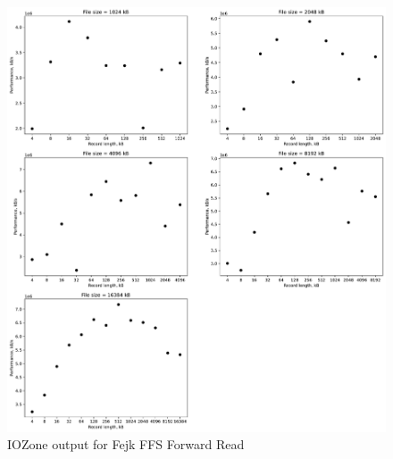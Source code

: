 \begin{figure}[!htb]
	\label{fig:app_bencfh_ffs_read}
	\begin{center}
		\includegraphics[width=1.0\textwidth]{figures/benchmarking/fake-ffs/Read.pdf}
	\end{center}
	\caption{IOZone output for Fejk FFS Forward Read}
\end{figure}

